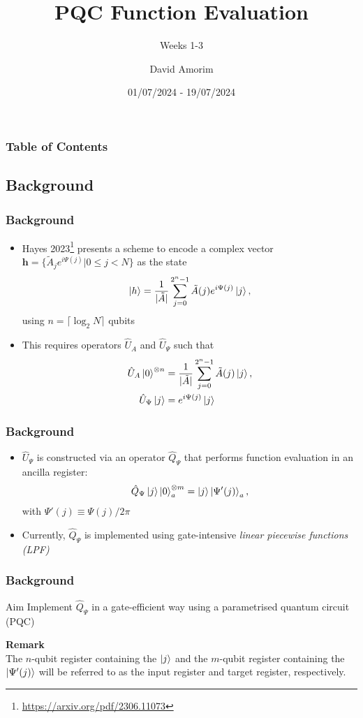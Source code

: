 \documentclass{beamer}
\title[PQC Function Evaluation]{PQC Function Evaluation}
\subtitle{Weeks 1-3}
\author[David Amorim]{David Amorim}
\institute[]{}
\date[2024]{01/07/2024 - 19/07/2024}
\begin{document}
\frame{\titlepage}

\begin{frame}
\frametitle{Table of Contents}
\tableofcontents
\end{frame}

\begin{frame}
\section{Background}
\frametitle{Background}

\begin{itemize}
\item Hayes 2023\footnote{\url{https://arxiv.org/pdf/2306.11073}} presents a scheme to encode a complex vector $\boldsymbol{h} =\{ \tilde{A}_j e^{i \Psi (j)} | 0 \leq j < N \}$ as the state 
\begin{equation}
\ket{h} = \frac{1}{|\tilde{A}|} \sum^{2^n-1}_{j=0} \tilde{A}(j) e^{i \Psi (j)} \ket{j}, 
\end{equation}
using $n = \lceil \log_2 N \rceil$ qubits
\item This requires operators $\hat{U}_A$ and $\hat{U}_\Psi$ such that 
\begin{align}
\hat{U}_A \ket{0}^{\otimes n} &=  \frac{1}{|\tilde{A}|} \sum^{2^n-1}_{j=0} \tilde{A}(j) \ket{j}, \\
\hat{U}_\Psi \ket{j} &= e^{i \Psi (j)} \ket{j}
\end{align}
\end{itemize}
\end{frame}

\begin{frame}
\frametitle{Background}
\begin{itemize}
\item $\hat{U}_\Psi$ is constructed via an operator $\hat{Q}_\Psi$ that performs \alert{function evaluation} in an ancilla register:
\begin{equation}
\hat{Q}_\Psi  \ket{j} \ket{0}^{\otimes m}_a = \ket{j} \ket{\Psi'(j)}_a,
\end{equation}
with $\Psi'(j) \equiv \Psi(j) / 2 \pi$
\item Currently, $\hat{Q}_\Psi$ is implemented using gate-intensive \emph{linear piecewise functions (LPF)}
\end{itemize}
\end{frame}

\begin{frame}
\frametitle{Background}
\begin{alertblock}{Aim}
Implement $\hat{Q}_\Psi$ in a gate-efficient way using a parametrised quantum circuit (PQC)
\end{alertblock}
\vspace{1cm}
\textbf{Remark} \\
The $n$-qubit register containing the $\ket{j}$ and the $m$-qubit register containing the $\ket{\Psi'(j)}$ will be referred to as the \alert{input register} and \alert{target register}, respectively. 
\end{frame}
\end{document}
